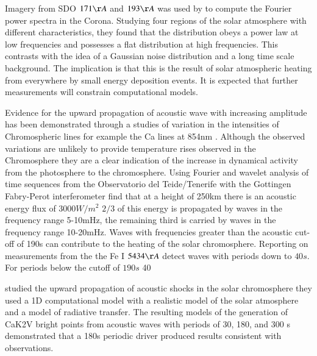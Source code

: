 \documentclass[final,1p]{elsarticle}
\begin{document}
 Imagery from SDO $171\AA$ and $193\AA$ was used by \cite{Ireland2014} to compute the Fourier power spectra in the Corona. Studying four regions of the solar atmosphere with different characteristics, they found that the distribution obeys a power law at low frequencies and possesses a flat distribution at high frequencies. This contrasts with the idea of a Gaussian noise distribution and a long time scale background. The implication is that this is the result of solar atmospheric heating from everywhere by small energy deposition events. It is expected that further measurements will constrain computational models. 

Evidence for the upward propagation of acoustic wave with increasing amplitude has been demonstrated through a studies of variation in the intensities of Chromospheric lines for example the Ca lines at 854nm \cite{Beck2012}. Although the observed variations are unlikely to provide temperature rises observed in the Chromosphere they are a clear indication of the increase in dynamical activity from the photosphere to the chromosphere. Using Fourier and wavelet analysis of time sequences from the Observatorio del Teide/Tenerife with the Gottingen Fabry-Perot interferometer \cite{Bello2009} find that at a height of 250km there is an acoustic energy flux of $3000W/m^2$  $2/3$ of this energy is propagated by waves in the frequency range 5-10mHz, the remaining third is carried by waves in the frequency range 10-20mHz. Waves with frequencies greater than the acoustic cut-off of 190s can contribute to the heating of the solar chromosphere. Reporting on measurements from the the Fe I $5434{\AA}$ \cite{Bello2010A} detect waves with periods down to $40s$. For periods below the cutoff of $190s$ 40%

  \cite{Carlsson1992} studied the upward propagation of acoustic shocks in the solar chromosphere they used a 1D computational model with a realistic model of the solar atmosphere and a model of radiative transfer. The resulting models of the generation of CaK2V bright points from acoustic waves with periods of 30, 180, and 300 s demonstrated that a 180s periodic driver produced results consistent with observations. 
\end{document}
